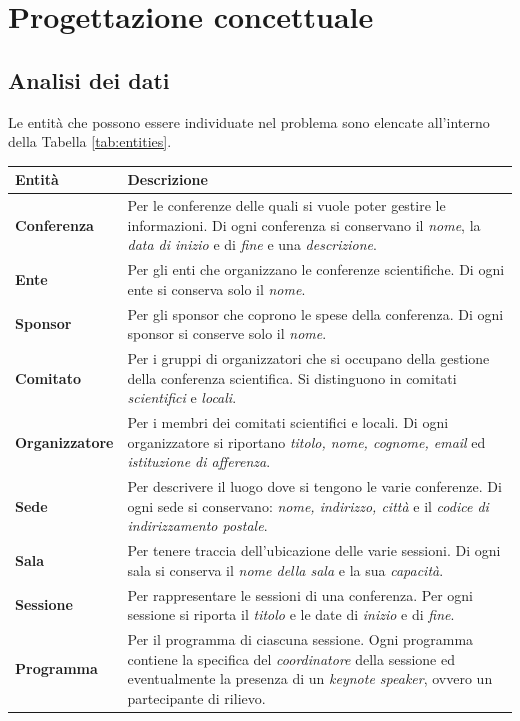 \chapter{Progettazione concettuale}
\section{Analisi dei dati}
Le entità che possono essere individuate nel problema sono elencate all'interno della Tabella \ref{tab:entities}.
\begin{table}[h!]
\begin{tabularx}{\textwidth}{|l|X|}
\hline
\textbf{Entità} & \textbf{Descrizione} \\
\hline
\textbf{Conferenza} & Per le conferenze delle quali si vuole poter gestire le informazioni. Di ogni conferenza si conservano il \textit{nome}, la \textit{data di inizio} e di \textit{fine} e una \textit{descrizione}. \\ \hline
\textbf{Ente} & Per gli enti che organizzano le conferenze scientifiche. Di ogni ente si conserva solo il \textit{nome}. \\ \hline
\textbf{Sponsor} & Per gli sponsor che coprono le spese della conferenza. Di ogni sponsor si conserve solo il \textit{nome}.\\ \hline
\textbf{Comitato} & Per i gruppi di organizzatori che si occupano della gestione della conferenza scientifica. Si distinguono in comitati \textit{scientifici} e \textit{locali}. \\ \hline
\textbf{Organizzatore} & Per i membri dei comitati scientifici e locali. Di ogni organizzatore si riportano \textit{titolo, nome, cognome, email} ed \textit{istituzione di afferenza}. \\ \hline
\textbf{Sede} & Per descrivere il luogo dove si tengono le varie conferenze. Di ogni sede si conservano: \textit{nome, indirizzo, città} e il \textit{codice di indirizzamento postale}. \\ \hline
\textbf{Sala} & Per tenere traccia dell'ubicazione delle varie sessioni. Di ogni sala si conserva il \textit{nome della sala} e la sua \textit{capacità}. \\ \hline
\textbf{Sessione} & Per rappresentare le sessioni di una conferenza. Per ogni sessione si riporta il \textit{titolo} e le date di \textit{inizio} e di \textit{fine}. \\ \hline
\textbf{Programma} & Per il programma di ciascuna sessione. Ogni programma contiene la specifica del \textit{coordinatore} della sessione ed eventualmente la presenza di un \textit{keynote speaker}, ovvero un partecipante di rilievo. \\ \hline

\end{tabularx}
\end{table}
